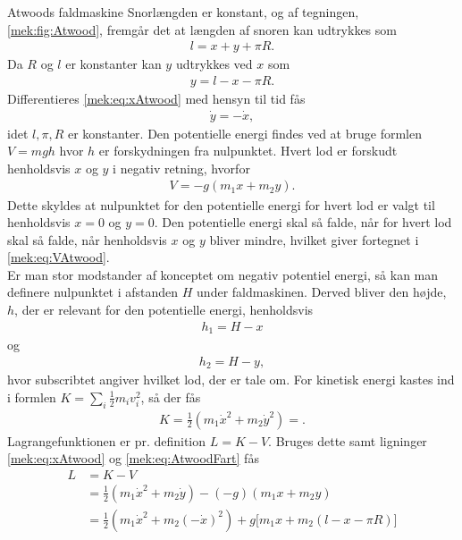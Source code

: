 \documentclass[crop=false, class=memoir]{standalone}
\begin{document}
\begin{opgave}[1]{Atwoods faldmaskine}
%
\opg Snorlængden er konstant, og af tegningen, \cref{mek:fig:Atwood}, fremgår det at længden af snoren kan udtrykkes som
%
\begin{align*}
	l = x + y + \pi R.
\end{align*}
%
Da $R$ og $l$ er konstanter kan $y$ udtrykkes ved $x$ som
%
\begin{align} \label{mek:eq:xAtwood}
	y = l - x - \pi R.
\end{align}
%
\opg Differentieres \cref{mek:eq:xAtwood} med hensyn til tid fås
%
\begin{align} \label{mek:eq:AtwoodFart}
	\dot{y} = -\dot{x},
\end{align}
%
idet $l,\pi,R$ er konstanter.
%
\opg Den potentielle energi findes ved at bruge formlen $V = mgh$ hvor $h$ er forskydningen fra nulpunktet. Hvert lod er forskudt henholdsvis $x$ og $y$ i negativ retning, hvorfor
%
\begin{align} \label{mek:eq:VAtwood}
	V = -g(m_1x + m_2y).
\end{align}
%
Dette skyldes at nulpunktet for den potentielle energi for hvert lod er valgt til henholdsvis $x=0$ og $y=0$. Den potentielle energi skal så falde, når for hvert lod skal så falde, når henholdsvis $x$ og $y$ bliver mindre, hvilket giver fortegnet i \cref{mek:eq:VAtwood}. \\
Er man stor modstander af konceptet om negativ potentiel energi, så kan man definere nulpunktet i afstanden $H$ under faldmaskinen. Derved bliver den højde, $h$, der er relevant for den potentielle energi, henholdsvis
%
\begin{align*}
	h_1 = H - x
\end{align*}
%
og
%
\begin{align*}
	h_2 = H - y,
\end{align*}
%
hvor subscribtet angiver hvilket lod, der er tale om.
%
\opg For kinetisk energi kastes ind i formlen $K = \sum_i\frac{1}{2}m_iv_i^2$, så der fås
%
\begin{align*}
	K = \frac{1}{2}(m_1\dot{x}^2 + m_2\dot{y}^2) =.
\end{align*}
%
\opg Lagrangefunktionen er pr. definition $L = K - V$. Bruges dette samt ligninger
\cref{mek:eq:xAtwood} og \cref{mek:eq:AtwoodFart} fås
%
\begin{align*}
	L &= K - V \\
	&= \frac{1}{2}(m_1\dot{x}^2 + m_2\dot{y}) - (-g)(m_1x + m_2y) \\
	&=  \frac{1}{2}(m_1\dot{x}^2 + m_2(-\dot{x})^2) + g\Big[m_1x + m_2(l - x - \pi R)\Big] \\

\end{align*}
\end{opgave}
\end{document}
